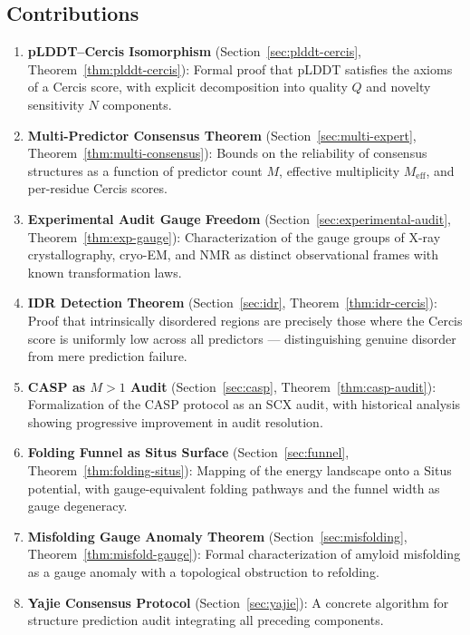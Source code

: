\documentclass[12pt,a4paper]{article}
\theoremstyle{remark}
\begin{document}
\subsection{Contributions}

\begin{enumerate}[leftmargin=*]
    \item \textbf{pLDDT--Cercis Isomorphism} (Section~\ref{sec:plddt-cercis}, Theorem~\ref{thm:plddt-cercis}): Formal proof that pLDDT satisfies the axioms of a Cercis score, with explicit decomposition into quality $Q$ and novelty sensitivity $N$ components.
    \item \textbf{Multi-Predictor Consensus Theorem} (Section~\ref{sec:multi-expert}, Theorem~\ref{thm:multi-consensus}): Bounds on the reliability of consensus structures as a function of predictor count $M$, effective multiplicity $M_{\text{eff}}$, and per-residue Cercis scores.
    \item \textbf{Experimental Audit Gauge Freedom} (Section~\ref{sec:experimental-audit}, Theorem~\ref{thm:exp-gauge}): Characterization of the gauge groups of X-ray crystallography, cryo-EM, and NMR as distinct observational frames with known transformation laws.
    \item \textbf{IDR Detection Theorem} (Section~\ref{sec:idr}, Theorem~\ref{thm:idr-cercis}): Proof that intrinsically disordered regions are precisely those where the Cercis score is uniformly low across all predictors — distinguishing genuine disorder from mere prediction failure.
    \item \textbf{CASP as $M > 1$ Audit} (Section~\ref{sec:casp}, Theorem~\ref{thm:casp-audit}): Formalization of the CASP protocol as an SCX audit, with historical analysis showing progressive improvement in audit resolution.
    \item \textbf{Folding Funnel as Situs Surface} (Section~\ref{sec:funnel}, Theorem~\ref{thm:folding-situs}): Mapping of the energy landscape onto a Situs potential, with gauge-equivalent folding pathways and the funnel width as gauge degeneracy.
    \item \textbf{Misfolding Gauge Anomaly Theorem} (Section~\ref{sec:misfolding}, Theorem~\ref{thm:misfold-gauge}): Formal characterization of amyloid misfolding as a gauge anomaly with a topological obstruction to refolding.
    \item \textbf{Yajie Consensus Protocol} (Section~\ref{sec:yajie}): A concrete algorithm for structure prediction audit integrating all preceding components.
\end{enumerate}
\end{document}
